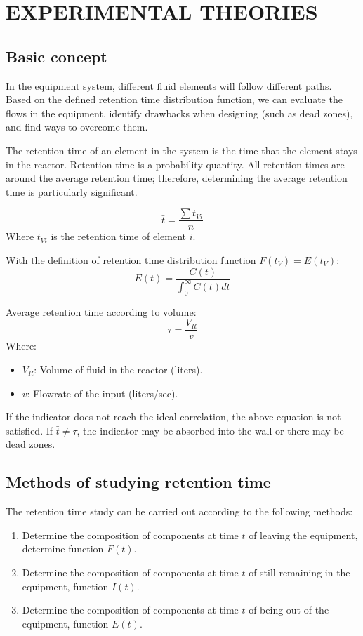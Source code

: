 \section{EXPERIMENTAL THEORIES}

\subsection{Basic concept}
In the equipment system, different fluid elements will follow different paths. Based on the defined retention time distribution function, we can evaluate the flows in the equipment, identify drawbacks when designing (such as dead zones), and find ways to overcome them.

The retention time of an element in the system is the time that the element stays in the reactor. Retention time is a probability quantity. All retention times are around the average retention time; therefore, determining the average retention time is particularly significant.

\begin{equation}
    \bar{t} = \frac{\sum t_{Vi}}{n}
\end{equation}
Where $t_{Vi}$ is the retention time of element $i$.

With the definition of retention time distribution function $F(t_V) = E(t_V)$:
\begin{equation}
    E(t) = \frac{C(t)}{\int_0^{\infty} C(t) dt}
\end{equation}

Average retention time according to volume:
\begin{equation}
    \tau = \frac{V_R}{v}
\end{equation}
Where:
\begin{itemize}
    \item $V_R$: Volume of fluid in the reactor (liters).
    \item $v$: Flowrate of the input (liters/sec).
\end{itemize}

If the indicator does not reach the ideal correlation, the above equation is not satisfied. If $\bar{t} \neq \tau$, the indicator may be absorbed into the wall or there may be dead zones.

\subsection{Methods of studying retention time}
The retention time study can be carried out according to the following methods:
\begin{enumerate}
    \item Determine the composition of components at time $t$ of leaving the equipment, determine function $F(t)$.
    \item Determine the composition of components at time $t$ of still remaining in the equipment, function $I(t)$.
    \item Determine the composition of components at time $t$ of being out of the equipment, function $E(t)$.
\end{enumerate}

